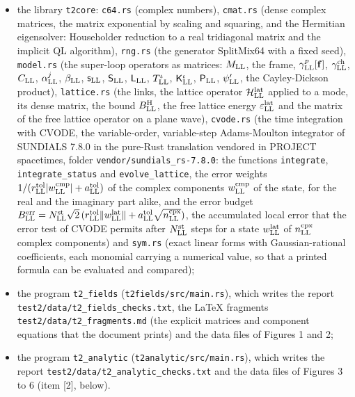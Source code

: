 \documentclass[
  10pt,
]{article}
\providecommand{\tightlist}{%
  \setlength{\itemsep}{0pt}\setlength{\parskip}{0pt}}
\begin{document}
\begin{itemize}
\tightlist
\item
  the library \texttt{t2core}: \texttt{c64.rs} (complex numbers),
  \texttt{cmat.rs} (dense complex matrices, the matrix exponential by
  scaling and squaring, and the Hermitian eigensolver: Householder
  reduction to a real tridiagonal matrix and the implicit QL algorithm),
  \texttt{rng.rs} (the generator SplitMix64 with a fixed seed),
  \texttt{model.rs} (the super-loop operators as matrices:
  \(M_{\rm LL}\), the frame, \(\gamma^p_{\rm LL}[\mathbf f]\),
  \(\gamma^{\rm ch}_{\rm LL}\), \(C_{\rm LL}\), \(\alpha^j_{\rm LL}\),
  \(\beta_{\rm LL}\), \(\mathsf s_{\rm LL}\), \(\mathsf S_{\rm LL}\),
  \(\mathsf L_{\rm LL}\), \(T^\iota_{\rm LL}\),
  \(\mathsf K^\iota_{\rm LL}\), \(\mathsf P_{\rm LL}\),
  \(\psi'_{\rm LL}\), the Cayley-Dickson product), \texttt{lattice.rs}
  (the links, the lattice operator \(\mathcal H^{\rm lat}_{\rm LL}\)
  applied to a mode, its dense matrix, the bound \(B^{\rm H}_{\rm LL}\),
  the free lattice energy \(\varepsilon^{\rm lat}_{\rm LL}\) and the
  matrix of the free lattice operator on a plane wave),
  \texttt{cvode.rs} (the time integration with CVODE, the
  variable-order, variable-step Adams-Moulton integrator of SUNDIALS
  7.8.0 in the pure-Rust translation vendored in PROJECT spacetimes,
  folder \texttt{vendor/sundials\_rs-7.8.0}: the functions
  \texttt{integrate}, \texttt{integrate\_status} and
  \texttt{evolve\_lattice}, the error weights
  \(1/(r^{\rm tol}_{\rm LL}\lvert w^{\rm cmp}_{\rm LL}\rvert+a^{\rm tol}_{\rm LL})\)
  of the complex components \(w^{\rm cmp}_{\rm LL}\) of the state, for
  the real and the imaginary part alike, and the error budget
  \(B^{\rm err}_{\rm LL}=N^{\rm st}_{\rm LL}\sqrt2\,(r^{\rm tol}_{\rm LL}\lVert w^{\rm lat}_{\rm LL}\rVert+a^{\rm tol}_{\rm LL}\sqrt{n^{\rm cpx}_{\rm LL}})\),
  the accumulated local error that the error test of CVODE permits after
  \(N^{\rm st}_{\rm LL}\) steps for a state \(w^{\rm lat}_{\rm LL}\) of
  \(n^{\rm cpx}_{\rm LL}\) complex components) and \texttt{sym.rs}
  (exact linear forms with Gaussian-rational coefficients, each monomial
  carrying a numerical value, so that a printed formula can be evaluated
  and compared);
\item
  the program \texttt{t2\_fields} (\texttt{t2fields/src/main.rs}), which
  writes the report \texttt{test2/data/t2\_fields\_checks.txt}, the
  LaTeX fragments \texttt{test2/data/t2\_fragments.md} (the explicit
  matrices and component equations that the document prints) and the
  data files of Figures 1 and 2;
\item
  the program \texttt{t2\_analytic} (\texttt{t2analytic/src/main.rs}),
  which writes the report \texttt{test2/data/t2\_analytic\_checks.txt}
  and the data files of Figures 3 to 6 (item {[}2{]}, below).
\end{itemize}
\end{document}
